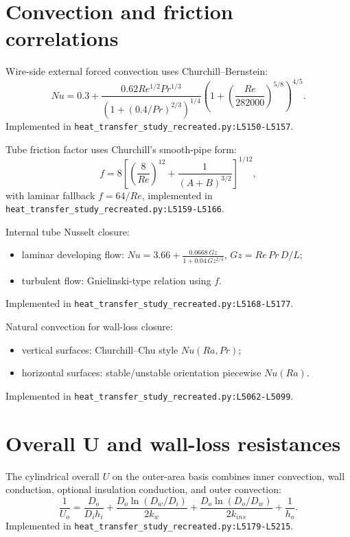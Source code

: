 \documentclass[11pt]{article}
\newcommand{\srcref}[1]{\nolinkurl{#1}}
\begin{document}
\section{Convection and friction correlations}
Wire-side external forced convection uses Churchill--Bernstein:
\begin{equation}
Nu = 0.3 + \frac{0.62 Re^{1/2} Pr^{1/3}}{\left(1+(0.4/Pr)^{2/3}\right)^{1/4}}
\left(1+\left(\frac{Re}{282000}\right)^{5/8}\right)^{4/5}.
\end{equation}
Implemented in \srcref{heat_transfer_study_recreated.py:L5150-L5157}.

Tube friction factor uses Churchill's smooth-pipe form:
\begin{equation}
f = 8\left[\left(\frac{8}{Re}\right)^{12} + \frac{1}{(A+B)^{3/2}}\right]^{1/12},
\end{equation}
with laminar fallback \(f=64/Re\), implemented in
\srcref{heat_transfer_study_recreated.py:L5159-L5166}.

Internal tube Nusselt closure:
\begin{itemize}[leftmargin=*]
\item laminar developing flow: \(Nu = 3.66 + \frac{0.0668\,Gz}{1+0.04\,Gz^{2/3}}\),
\(Gz=Re\,Pr\,D/L\);
\item turbulent flow: Gnielinski-type relation using \(f\).
\end{itemize}
Implemented in \srcref{heat_transfer_study_recreated.py:L5168-L5177}.

Natural convection for wall-loss closure:
\begin{itemize}[leftmargin=*]
\item vertical surfaces: Churchill--Chu style \(Nu(Ra,Pr)\);
\item horizontal surfaces: stable/unstable orientation piecewise \(Nu(Ra)\).
\end{itemize}
Implemented in \srcref{heat_transfer_study_recreated.py:L5062-L5099}.

\section{Overall U and wall-loss resistances}
The cylindrical overall \(U\) on the outer-area basis combines inner convection,
wall conduction, optional insulation conduction, and outer convection:
\begin{equation}
\frac{1}{U_o} =
\frac{D_o}{D_i h_i}
 + \frac{D_o \ln(D_w/D_i)}{2k_w}
 + \frac{D_o \ln(D_o/D_w)}{2k_{ins}}
 + \frac{1}{h_o}.
\end{equation}
Implemented in \srcref{heat_transfer_study_recreated.py:L5179-L5215}.
\end{document}
